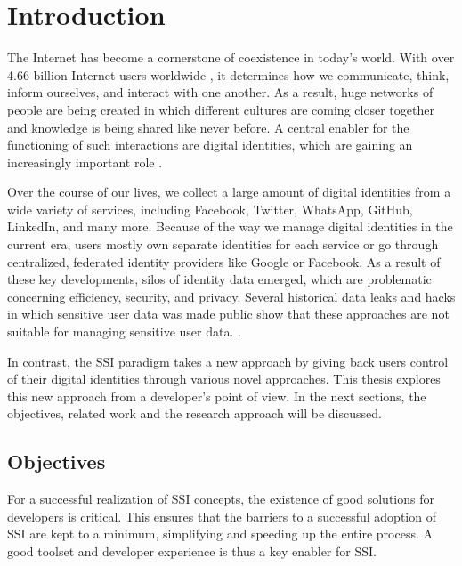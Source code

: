 \chapter{Introduction}
	The Internet has become a cornerstone of coexistence in today's world. With over 4.66 billion Internet users worldwide \cite{johnson_internet_2021}, it determines how we communicate, think, inform ourselves, and interact with one another.	As a result, huge networks of people are being created in which different cultures are coming closer together and knowledge is being shared like never before.
	A central enabler for the functioning of such interactions are digital identities, which are gaining an increasingly important role \cite{liu_blockchain-based_2020}.
	
	Over the course of our lives, we collect a large amount of digital identities from a wide variety of services, including Facebook, Twitter, WhatsApp, GitHub, LinkedIn, and many more. Because of the way we manage digital identities in the current era, users mostly own separate identities for each service or go through centralized, federated identity providers like Google or Facebook. As a result of these key developments, silos of identity data emerged, which are problematic concerning efficiency, security, and privacy. Several historical data leaks and hacks in which sensitive user data was made public show that these approaches are not suitable for managing sensitive user data. \cite{swinhoe_15_2021}. \cite{ehrlich_self-sovereign_2021}
	
	In contrast, the \ac{SSI} paradigm takes a new approach by giving back users control of their digital identities through various novel approaches. This thesis explores this new approach from a developer's point of view. In the next sections, the objectives, related work and the research approach will be discussed.
	
	\section{Objectives} %
	
	For a successful realization of \acf{SSI} concepts, the existence of good solutions for developers is critical. This ensures that the barriers to a successful adoption of \ac{SSI} are kept to a minimum, simplifying and speeding up the entire process. A good toolset and developer experience is thus a key enabler for \ac{SSI}.
	
